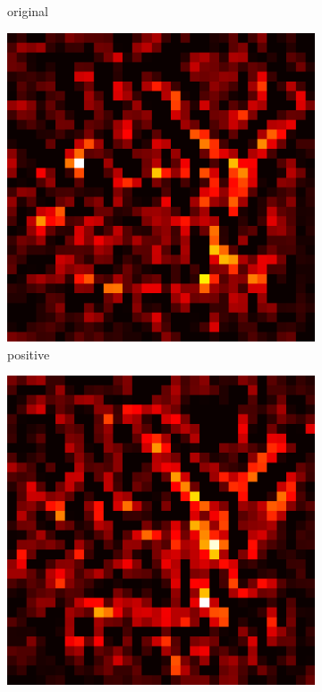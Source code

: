 \documentclass[preprint,12pt]{elsarticle}
\begin{document}
\begin{figure}
\begin{subfigure}{0.14\linewidth}
        \caption{original}
    \end{subfigure}
    \hfill
    \begin{subfigure}{0.14\textwidth}
        \centering
        \includegraphics[width=\linewidth]{../visualizations/examples/cifar10/resnet18/positive_saliency_map/4.png}
        \caption{positive}
    \end{subfigure}
    \hfill
    \begin{subfigure}{0.14\textwidth}
        \centering
        \includegraphics[width=\linewidth]{../visualizations/examples/cifar10/resnet18/negative_saliency_map/4.png}

\end{subfigure}
\end{figure}
\end{document}

